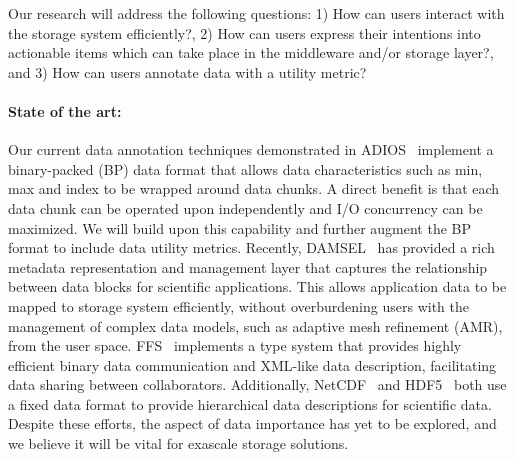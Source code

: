 



Our research will address the following questions:
1) How can users interact with the storage system efficiently?,
2) How can users express their intentions into actionable items which can take place in the middleware and/or storage layer?, and
3) How can users annotate data with a utility metric?

\paragraph{State of the art:}
Our current data annotation techniques demonstrated in
ADIOS~\cite{lofstead:2009:adaptible} implement a binary-packed (BP) data format that
allows data characteristics such as min, max and index to be wrapped around
data chunks. A direct benefit is that each data chunk can be operated upon
independently and I/O concurrency can be maximized. We will build upon this
capability and further augment the BP format to include data utility metrics.
Recently,
DAMSEL~\cite{damsel} has provided a rich metadata representation and management
layer that captures the relationship between data blocks for scientific
applications.  This allows application data to be mapped to storage system
efficiently, without overburdening users with the management of complex data models, such
as adaptive mesh refinement (AMR), from the user space. 
FFS~\cite{ffs} implements a type system that provides highly efficient binary
data communication and XML-like data description, facilitating data sharing
between collaborators. Additionally, NetCDF~\cite{netcdf} and HDF5~\cite{hdf5}
both use a fixed data format to provide hierarchical data descriptions for scientific data.
Despite these efforts, the aspect of data importance has yet to be 
explored, and we believe it will be vital for exascale storage solutions.

